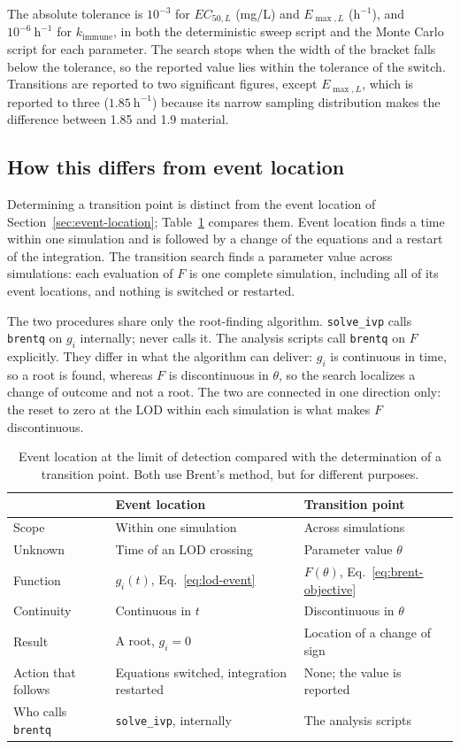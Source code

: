 \documentclass[11pt]{article}
\newcommand{\EC}{EC_{50,L}}
\newcommand{\EM}{E_{\max,L}}
\newcommand{\KI}{k_{\mathrm{immune}}}
\begin{document}
The absolute tolerance is $10^{-3}$ for $\EC$ (mg/L) and $\EM$
($\mathrm{h}^{-1}$), and $10^{-6}~\mathrm{h}^{-1}$ for $\KI$, in both the
deterministic sweep script and the Monte Carlo script for each parameter. The
search stops when the width of the bracket falls below the tolerance, so the
reported value lies within the tolerance of the switch. Transitions are
reported to two significant figures, except $\EM$, which is reported to
three ($1.85~\mathrm{h}^{-1}$) because its narrow sampling distribution makes
the difference between 1.85 and 1.9 material.

\subsection{How this differs from event location}

Determining a transition point is distinct from the event location of
Section~\ref{sec:event-location}; Table~\ref{tab:event-vs-transition}
compares them. Event location finds a time within one simulation and is
followed by a change of the equations and a restart of the integration. The
transition search finds a parameter value across simulations: each evaluation
of $F$ is one complete simulation, including all of its event locations, and
nothing is switched or restarted.

The two procedures share only the root-finding algorithm.
\texttt{solve\_ivp} calls \texttt{brentq} on $g_i$ internally;
 never calls it. The analysis scripts call \texttt{brentq}
on $F$ explicitly. They differ in what the algorithm can deliver: $g_i$ is
continuous in time, so a root is found, whereas $F$ is discontinuous in
$\theta$, so the search localizes a change of outcome and not a root. The two
are connected in one direction only: the reset to zero at the LOD within each
simulation is what makes $F$ discontinuous.

\begin{table}[htbp]
\centering
\small
\begin{tabular}{@{}lll@{}}
\toprule
 & Event location & Transition point \\
\midrule
Scope & Within one simulation & Across simulations \\
Unknown & Time of an LOD crossing & Parameter value $\theta$ \\
Function & $g_i(t)$, Eq.~\eqref{eq:lod-event} & $F(\theta)$, Eq.~\eqref{eq:brent-objective} \\
Continuity & Continuous in $t$ & Discontinuous in $\theta$ \\
Result & A root, $g_i=0$ & Location of a change of sign \\
Action that follows & Equations switched, integration restarted & None; the value is reported \\
Who calls \texttt{brentq} & \texttt{solve\_ivp}, internally & The analysis scripts \\
\bottomrule
\end{tabular}
\caption{Event location at the limit of detection compared with the
determination of a transition point. Both use Brent's method, but for
different purposes.}
\label{tab:event-vs-transition}
\end{table}
\end{document}

